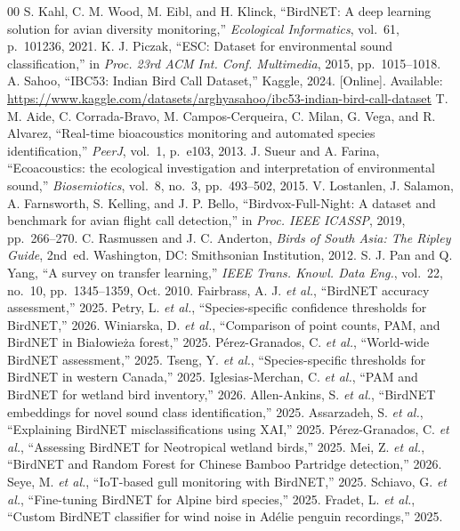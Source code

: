 \documentclass[conference]{IEEEtran}
\begin{document}
\begin{thebibliography}{00}
 S. Kahl, C. M. Wood, M. Eibl, and H. Klinck, ``BirdNET: A deep learning solution for avian diversity monitoring,'' \textit{Ecological Informatics}, vol.~61, p.~101236, 2021.
 K. J. Piczak, ``ESC: Dataset for environmental sound classification,'' in \textit{Proc. 23rd ACM Int. Conf. Multimedia}, 2015, pp.~1015--1018.
 A. Sahoo, ``IBC53: Indian Bird Call Dataset,'' Kaggle, 2024. [Online]. Available: \url{https://www.kaggle.com/datasets/arghyasahoo/ibc53-indian-bird-call-dataset}
 T. M. Aide, C. Corrada-Bravo, M. Campos-Cerqueira, C. Milan, G. Vega, and R. Alvarez, ``Real-time bioacoustics monitoring and automated species identification,'' \textit{PeerJ}, vol.~1, p.~e103, 2013.
 J. Sueur and A. Farina, ``Ecoacoustics: the ecological investigation and interpretation of environmental sound,'' \textit{Biosemiotics}, vol.~8, no.~3, pp.~493--502, 2015.
 V. Lostanlen, J. Salamon, A. Farnsworth, S. Kelling, and J. P. Bello, ``Birdvox-Full-Night: A dataset and benchmark for avian flight call detection,'' in \textit{Proc. IEEE ICASSP}, 2019, pp.~266--270.
 C. Rasmussen and J. C. Anderton, \textit{Birds of South Asia: The Ripley Guide}, 2nd~ed. Washington, DC: Smithsonian Institution, 2012.
 S. J. Pan and Q. Yang, ``A survey on transfer learning,'' \textit{IEEE Trans. Knowl. Data Eng.}, vol.~22, no.~10, pp.~1345--1359, Oct. 2010.
 Fairbrass, A. J. \textit{et al.}, ``BirdNET accuracy assessment,'' 2025.
 Petry, L. \textit{et al.}, ``Species-specific confidence thresholds for BirdNET,'' 2026.
 Winiarska, D. \textit{et al.}, ``Comparison of point counts, PAM, and BirdNET in Bia\l{}owie\.{z}a forest,'' 2025.
 P\'{e}rez-Granados, C. \textit{et al.}, ``World-wide BirdNET assessment,'' 2025.
 Tseng, Y. \textit{et al.}, ``Species-specific thresholds for BirdNET in western Canada,'' 2025.
 Iglesias-Merchan, C. \textit{et al.}, ``PAM and BirdNET for wetland bird inventory,'' 2026.
 Allen-Ankins, S. \textit{et al.}, ``BirdNET embeddings for novel sound class identification,'' 2025.
 Assarzadeh, S. \textit{et al.}, ``Explaining BirdNET misclassifications using XAI,'' 2025.
 P\'{e}rez-Granados, C. \textit{et al.}, ``Assessing BirdNET for Neotropical wetland birds,'' 2025.
 Mei, Z. \textit{et al.}, ``BirdNET and Random Forest for Chinese Bamboo Partridge detection,'' 2026.
 Seye, M. \textit{et al.}, ``IoT-based gull monitoring with BirdNET,'' 2025.
 Schiavo, G. \textit{et al.}, ``Fine-tuning BirdNET for Alpine bird species,'' 2025.
 Fradet, L. \textit{et al.}, ``Custom BirdNET classifier for wind noise in Ad\'{e}lie penguin recordings,'' 2025.
\end{thebibliography}
\end{document}
